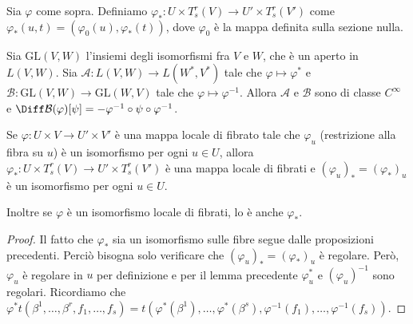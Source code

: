 \begin{definition}
	Sia $\varphi$ come sopra. Definiamo $\varphi_*: U \times T_s^r(V) \to U'\times T_s^r(V')$ come $\varphi_*(u,t) = (\varphi_0(u), \varphi_*(t))$, dove $\varphi_0$ è la mappa definita sulla sezione nulla.
\end{definition}

\begin{lemma}
	Sia $\mathrm {GL} (V,W)$ l'insiemi degli isomorfismi fra $V$ e $W$, che è un aperto in $L(V,W)$. Sia $\mathcal A:L(V,W)\to L(W^*,V^*)$ tale che $\varphi\mapsto \varphi^*$ e $\mathcal B: \mathrm {GL} (V,W) \to \mathrm {GL} (W,V)$ tale che $\varphi \mapsto \varphi^{-1}$. %
	Allora $\mathcal A$ e $\mathcal B$ sono di classe $C^\infty$ e $\Diff \mathcal B(\varphi)[\psi] = -\varphi^{-1}\circ\psi\circ\varphi^{-1}$.
\end{lemma}

\begin{proposition}
	Se $\varphi:U\times V\to U'\times V'$ è una mappa locale di fibrato tale che $\varphi_u$ (restrizione alla fibra su $u$) è un isomorfismo per ogni $u\in U$, allora $\varphi_*: U\times T_s^r(V)\to U'\times T_s^r(V')$ è una mappa locale di fibrati e $(\varphi_u)_* = (\varphi_*)_u$ è un isomorfismo per ogni $u\in U$.
	
	Inoltre se $\varphi$ è un isomorfismo locale di fibrati, lo è anche $\varphi_*$.
\end{proposition}

\begin{proof}
	Il fatto che $\varphi_*$ sia un isomorfismo sulle fibre segue dalle proposizioni precedenti. %
	Perciò bisogna solo verificare che $(\varphi_u)_*=(\varphi_*)_u$ è regolare. Però, $\varphi_u$ è regolare in $u$ per definizione e per il lemma precedente $\varphi_u^*$ e $(\varphi_u)^{-1}$ sono regolari.
	Ricordiamo che $\varphi^*t(\beta^1,\ldots,\beta^r,f_1,\ldots,f_s) = t(\varphi^*(\beta^1),\ldots,\varphi^*(\beta^s),\varphi^{-1}(f_1),\ldots,\varphi^{-1}(f_s))$. %
\end{proof}







